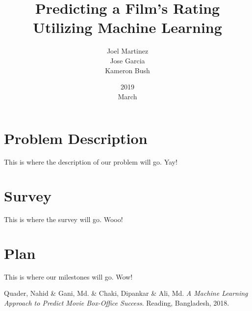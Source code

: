 \documentclass{article}
\title{Predicting a Film's Rating Utilizing Machine Learning}
\date{2019\\ March}
\author{Joel Martinez\\ Jose Garcia\\ Kameron Bush}
\begin{document}
	\maketitle
	\section{Problem Description}
	This is where the description of our problem will go. Yay!
	
	\section{Survey}
	This is where the survey will go. Wooo!
	
	\section{Plan}
	This is where our milestones will go. Wow!
	
	\begin{thebibliography}{9}
		Quader, Nahid \& Gani, Md. \& Chaki, Dipankar \& Ali, Md. 
		\textit{A Machine Learning Approach to Predict Movie Box-Office Success}. 
		Reading, Bangladesh, 2018.
	\end{thebibliography}
\end{document}
